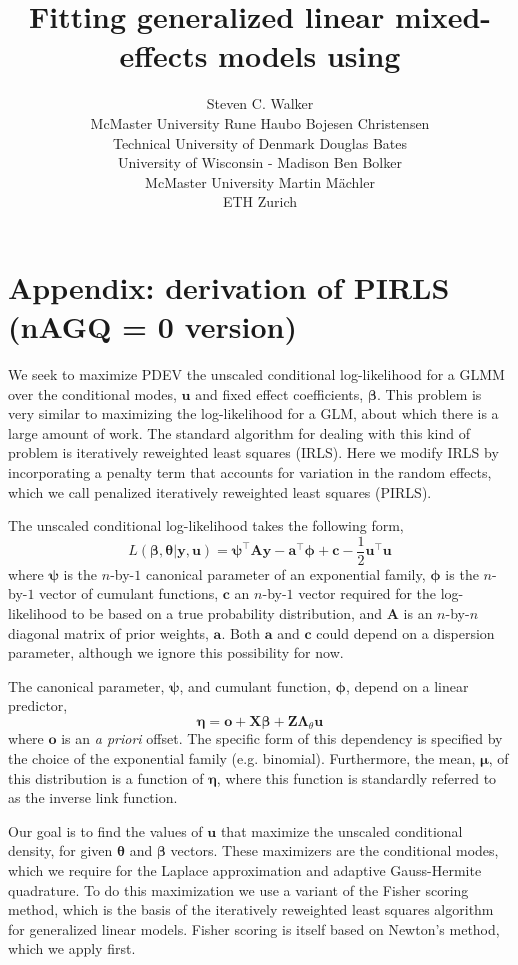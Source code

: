 \documentclass{jss}
\author{
  Steven C. Walker\\McMaster University \And
  Rune Haubo Bojesen Christensen\\Technical University of Denmark\AND
  Douglas Bates\\University of Wisconsin - Madison \And
  Ben Bolker\\McMaster University \AND
  Martin M\"achler\\ETH Zurich
}
\title{Fitting generalized linear \bmb{and nonlinear?} mixed-effects models using \pkg{lme4}}
\begin{document}

\section{Appendix: derivation of PIRLS (nAGQ = 0 version)}

We seek to maximize PDEV the unscaled conditional log-likelihood 
for a GLMM over the conditional modes, $\bm u$ and fixed effect
coefficients, $\bm\beta$. This problem is very similar to maximizing
the log-likelihood for a GLM, about which there is a large amount of
work. The standard algorithm for dealing with this kind of problem is
iteratively reweighted least squares (IRLS). Here we modify IRLS by
incorporating a penalty term that accounts for variation in the random
effects, which we call penalized iteratively reweighted least squares (PIRLS). 

The unscaled conditional log-likelihood takes the following form,
\begin{equation}
L(\bm\beta, \bm\theta | \bm y, \bm u) = 
\bm\psi^\top \bm A \bm y - 
\bm a^\top \bm \phi  + 
\bm c -
\frac{1}{2}\bm u^\top \bm u
\end{equation}
where $\bm\psi$ is the $n$-by-$1$ canonical parameter of an exponential family,
$\bm\phi$ is the $n$-by-$1$ vector of cumulant functions, $\bm c$ an
$n$-by-$1$ vector required for the log-likelihood to be based on a
true probability distribution, and $\bm A$ is an $n$-by-$n$ diagonal
matrix of prior weights, $\bm a$. Both $\bm a$ and $\bm c$ could depend on a dispersion
parameter, although we ignore this possibility for now.

The canonical parameter, $\bm\psi$, and cumulant function, $\bm\phi$,
depend on a linear predictor,
\begin{equation}
\bm\eta = \bm o + \bm X \bm\beta + \bm Z \bm\Lambda_\theta \bm u
\end{equation}
where $\bm o$ is an \emph{a priori} offset. The specific form of this
dependency is specified by the choice of the exponential family
(e.g. binomial). Furthermore, the mean, $\bm\mu$, of this distribution
is a function of $\bm\eta$, where this function is standardly referred
to as the inverse link function.

Our goal is to find the values of $\bm u$ that maximize the unscaled
conditional density, for given $\bm\theta$ and $\bm\beta$
vectors. These maximizers are the conditional modes, which we require
for the Laplace approximation and adaptive Gauss-Hermite
quadrature. To do this maximization we use a variant of the Fisher
scoring method, which is the basis of the iteratively reweighted least
squares algorithm for generalized linear models. Fisher scoring is itself
based on Newton's method, which we apply first.
\end{document}
